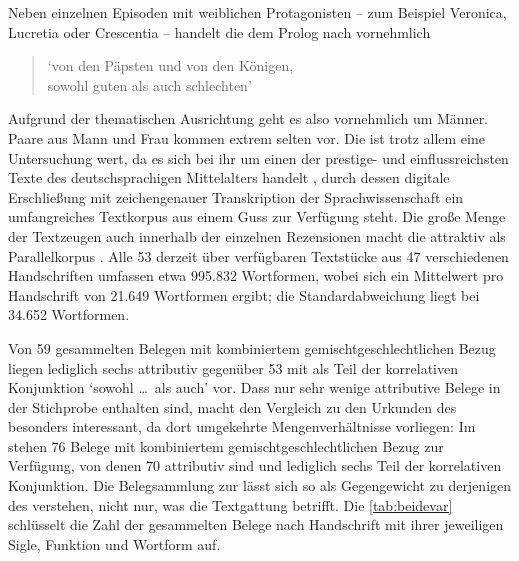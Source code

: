 Neben einzelnen Episoden mit weiblichen Protagonisten -- zum Beispiel Veronica,
Lucretia oder Crescentia \autocite[729--838, 4335--4772,
11518--12808]{schroeder1895} -- handelt die \KC{} dem Prolog nach
vornehmlich

\blockcquote[][\pno~19--20]{schroeder1895}[]{

	`von den Päpsten und von den Königen,\\
	sowohl guten als auch schlechten'
}

Aufgrund der thematischen Ausrichtung geht es also vornehmlich um Männer. Paare
aus Mann und Frau kommen extrem selten vor. Die \KC{} ist trotz allem
eine Untersuchung wert, da es sich bei ihr um einen der prestige- und
einflussreichsten Texte des deutschsprachigen Mittelalters handelt
\autocite[93]{wolf2008}, durch dessen digitale Erschließung mit zeichengenauer
Transkription \autocite{kcdigital} der Sprachwissenschaft ein umfangreiches
Textkorpus aus einem Guss zur Verfügung steht. Die große Menge der Textzeugen
auch innerhalb der einzelnen Rezensionen macht die \KC{} attraktiv als
Parallelkorpus \autocite{cysouwwaelchli2007}. Alle 53 derzeit über
 verfügbaren Textstücke aus 47 verschiedenen Handschriften
umfassen etwa 995.832 Wortformen, wobei sich ein Mittelwert pro Handschrift von
21.649 Wortformen ergibt; die Standardabweichung liegt bei 34.652 Wortformen.

Von 59 gesammelten Belegen mit kombiniertem gemischtgeschlechtlichen Bezug
liegen lediglich sechs attributiv gegenüber 53 mit  als Teil der
korrelativen Konjunktion  `sowohl \dots\ als auch'
vor. Dass nur sehr wenige attributive Belege in der Stichprobe enthalten sind,
macht den Vergleich zu den Urkunden des \CAO{} besonders interessant,
da dort umgekehrte Mengenverhältnisse vorliegen: Im \CAO{} stehen 76
Belege mit kombiniertem gemischtgeschlechtlichen Bezug zur Verfügung, von denen
70 attributiv sind und lediglich sechs Teil der korrelativen Konjunktion. Die
Belegsammlung zur \KC{} lässt sich so als Gegengewicht zu derjenigen des
\CAO{} verstehen, nicht nur, was die Textgattung betrifft. Die
\cref{tab:beidevar} schlüsselt die Zahl der gesammelten Belege nach Handschrift
mit ihrer jeweiligen Sigle, Funktion und Wortform auf.


